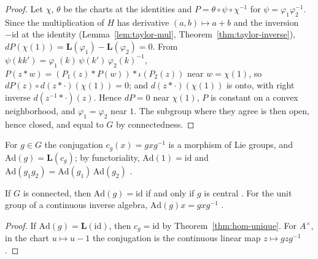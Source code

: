 \begin{proof}
  \leanok
  Let $\chi$, $\theta$ be the charts at the identities and $P = \theta \circ \psi \circ \chi^{-1}$
  for $\psi = \varphi_1 \varphi_2^{-1}$. Since the multiplication of $H$ has derivative
  $(a, b) \mapsto a + b$ and the inversion $-\mathrm{id}$ at the identity
  (Lemma~\ref{lem:taylor-mul}, Theorem~\ref{thm:taylor-inverse}),
  $dP(\chi(1)) = \mathbf{L}(\varphi_1) - \mathbf{L}(\varphi_2) = 0$. From
  $\psi(k k') = \varphi_1(k)\,\psi(k')\,\varphi_2(k)^{-1}$,
  $P(z * w) = (P_1(z) * P(w)) * \iota(P_2(z))$ near $w = \chi(1)$, so
  $dP(z) \circ d(z * \cdot)(\chi(1)) = 0$; and $d(z * \cdot)(\chi(1))$ is onto, with right inverse
  $d(z^{-1} * \cdot)(z)$. Hence $dP = 0$ near $\chi(1)$, $P$ is constant on a convex neighborhood, and
  $\varphi_1 = \varphi_2$ near $1$. The subgroup where they agree is then open, hence closed, and
  equal to $G$ by connectedness.
\end{proof}

\begin{definition}
  \label{def:Ad}
  \leanok
  For $g \in G$ the conjugation $c_g(x) = gxg^{-1}$ is a morphism of Lie groups, and
  $\mathrm{Ad}(g) = \mathbf{L}(c_g)$; by functoriality, $\mathrm{Ad}(1) = \mathrm{id}$ and
  $\mathrm{Ad}(g_1 g_2) = \mathrm{Ad}(g_1)\,\mathrm{Ad}(g_2)$ \cite[Definition 5.2.4]{GN26}.
\end{definition}

\begin{proposition}
  \label{prop:ker-Ad}
  \leanok
  If $G$ is connected, then $\mathrm{Ad}(g) = \mathrm{id}$ if and only if $g$ is central
  \cite[Corollary 5.5.8]{GN26}. For the unit group of a continuous inverse algebra,
  $\mathrm{Ad}(g)x = gxg^{-1}$ \cite[Example 5.2.6(a)]{GN26}.
\end{proposition}

\begin{proof}
  \leanok
  If $\mathrm{Ad}(g) = \mathbf{L}(\mathrm{id})$, then $c_g = \mathrm{id}$ by
  Theorem~\ref{thm:hom-unique}. For $A^\times$, in the chart $u \mapsto u - 1$ the conjugation is
  the continuous linear map $z \mapsto gzg^{-1}$.
\end{proof}

